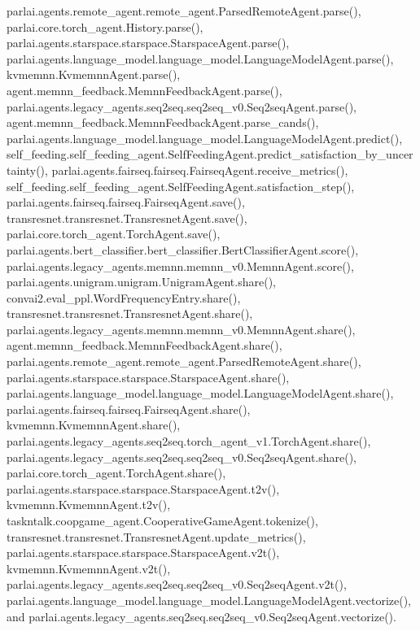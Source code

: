 parlai.\+agents.\+remote\+\_\+agent.\+remote\+\_\+agent.\+Parsed\+Remote\+Agent.\+parse(), parlai.\+core.\+torch\+\_\+agent.\+History.\+parse(), parlai.\+agents.\+starspace.\+starspace.\+Starspace\+Agent.\+parse(), parlai.\+agents.\+language\+\_\+model.\+language\+\_\+model.\+Language\+Model\+Agent.\+parse(), kvmemnn.\+Kvmemnn\+Agent.\+parse(), agent.\+memnn\+\_\+feedback.\+Memnn\+Feedback\+Agent.\+parse(), parlai.\+agents.\+legacy\+\_\+agents.\+seq2seq.\+seq2seq\+\_\+v0.\+Seq2seq\+Agent.\+parse(), agent.\+memnn\+\_\+feedback.\+Memnn\+Feedback\+Agent.\+parse\+\_\+cands(), parlai.\+agents.\+language\+\_\+model.\+language\+\_\+model.\+Language\+Model\+Agent.\+predict(), self\+\_\+feeding.\+self\+\_\+feeding\+\_\+agent.\+Self\+Feeding\+Agent.\+predict\+\_\+satisfaction\+\_\+by\+\_\+uncertainty(), parlai.\+agents.\+fairseq.\+fairseq.\+Fairseq\+Agent.\+receive\+\_\+metrics(), self\+\_\+feeding.\+self\+\_\+feeding\+\_\+agent.\+Self\+Feeding\+Agent.\+satisfaction\+\_\+step(), parlai.\+agents.\+fairseq.\+fairseq.\+Fairseq\+Agent.\+save(), transresnet.\+transresnet.\+Transresnet\+Agent.\+save(), parlai.\+core.\+torch\+\_\+agent.\+Torch\+Agent.\+save(), parlai.\+agents.\+bert\+\_\+classifier.\+bert\+\_\+classifier.\+Bert\+Classifier\+Agent.\+score(), parlai.\+agents.\+legacy\+\_\+agents.\+memnn.\+memnn\+\_\+v0.\+Memnn\+Agent.\+score(), parlai.\+agents.\+unigram.\+unigram.\+Unigram\+Agent.\+share(), convai2.\+eval\+\_\+ppl.\+Word\+Frequency\+Entry.\+share(), transresnet.\+transresnet.\+Transresnet\+Agent.\+share(), parlai.\+agents.\+legacy\+\_\+agents.\+memnn.\+memnn\+\_\+v0.\+Memnn\+Agent.\+share(), agent.\+memnn\+\_\+feedback.\+Memnn\+Feedback\+Agent.\+share(), parlai.\+agents.\+remote\+\_\+agent.\+remote\+\_\+agent.\+Parsed\+Remote\+Agent.\+share(), parlai.\+agents.\+starspace.\+starspace.\+Starspace\+Agent.\+share(), parlai.\+agents.\+language\+\_\+model.\+language\+\_\+model.\+Language\+Model\+Agent.\+share(), parlai.\+agents.\+fairseq.\+fairseq.\+Fairseq\+Agent.\+share(), kvmemnn.\+Kvmemnn\+Agent.\+share(), parlai.\+agents.\+legacy\+\_\+agents.\+seq2seq.\+torch\+\_\+agent\+\_\+v1.\+Torch\+Agent.\+share(), parlai.\+agents.\+legacy\+\_\+agents.\+seq2seq.\+seq2seq\+\_\+v0.\+Seq2seq\+Agent.\+share(), parlai.\+core.\+torch\+\_\+agent.\+Torch\+Agent.\+share(), parlai.\+agents.\+starspace.\+starspace.\+Starspace\+Agent.\+t2v(), kvmemnn.\+Kvmemnn\+Agent.\+t2v(), taskntalk.\+coopgame\+\_\+agent.\+Cooperative\+Game\+Agent.\+tokenize(), transresnet.\+transresnet.\+Transresnet\+Agent.\+update\+\_\+metrics(), parlai.\+agents.\+starspace.\+starspace.\+Starspace\+Agent.\+v2t(), kvmemnn.\+Kvmemnn\+Agent.\+v2t(), parlai.\+agents.\+legacy\+\_\+agents.\+seq2seq.\+seq2seq\+\_\+v0.\+Seq2seq\+Agent.\+v2t(), parlai.\+agents.\+language\+\_\+model.\+language\+\_\+model.\+Language\+Model\+Agent.\+vectorize(), and parlai.\+agents.\+legacy\+\_\+agents.\+seq2seq.\+seq2seq\+\_\+v0.\+Seq2seq\+Agent.\+vectorize().


